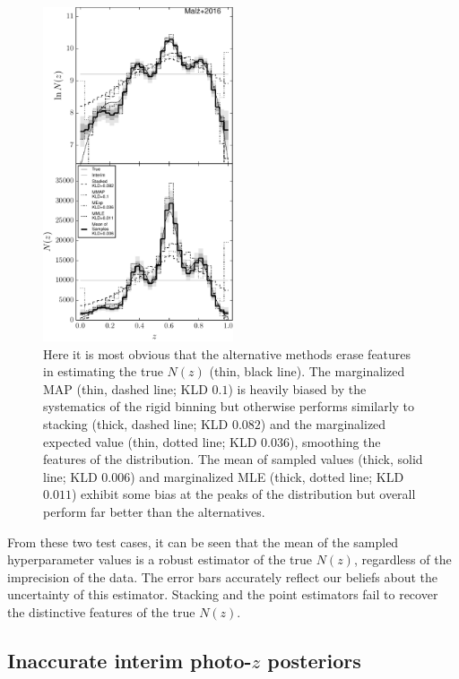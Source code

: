 \documentclass[preprint]{aastex}
\begin{document}
\begin{figure}
\includegraphics[width=0.5\textwidth]{figs/sig4/comps.pdf}
\caption{Here it is most obvious that the alternative methods erase features in 
estimating the true $N(z)$ (thin, black line).  The marginalized MAP (thin, 
dashed line; KLD $0.1$) is heavily biased by the systematics of the rigid 
binning but otherwise performs similarly to stacking (thick, dashed line; KLD 
$0.082$) and the marginalized expected value (thin, dotted line; KLD $0.036$), 
smoothing the features of the distribution.  The mean of sampled values (thick, 
solid line; KLD $0.006$) and marginalized MLE (thick, dotted line; KLD $0.011$) 
exhibit some bias at the peaks of the distribution but overall perform far 
better than the alternatives.}
\label{fig:sig4-comp}
\end{figure}

From these two test cases, it can be seen that the mean of the sampled 
hyperparameter values is a robust estimator of the true $N(z)$, regardless of 
the imprecision of the data.  The error bars accurately reflect our beliefs 
about the uncertainty of this estimator.  Stacking and the point estimators 
fail to recover the distinctive features of the true $N(z)$.

\clearpage
\subsection{Inaccurate interim photo-$z$ posteriors}
\label{sec:multi}
\end{document}
